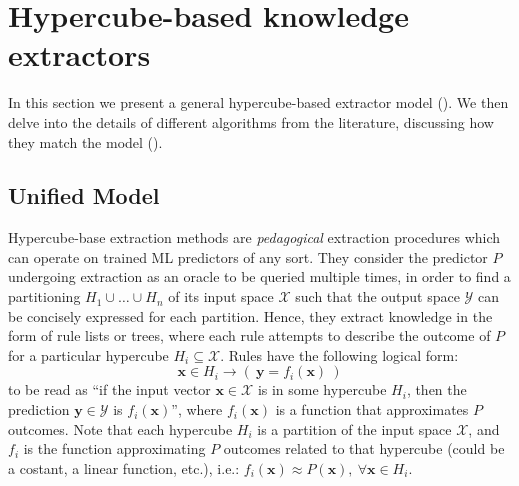 \documentclass[
]{ceurart}
\begin{document}
\section{Hypercube-based knowledge extractors}

In this section we present a general hypercube-based extractor model ().
%
We then delve into the details of different algorithms from the literature, discussing how they match the model ().

\subsection{Unified Model}

Hypercube-base extraction methods are \emph{pedagogical} extraction procedures which can operate on trained ML predictors of any sort.
%
They consider the predictor $P$ undergoing extraction as an oracle to be queried multiple times, in order to find a partitioning $H_1 \cup \ldots \cup H_n$ of its input space $\mathcal{X}$ such that the output space $\mathcal{Y}$ can be concisely %
expressed for each partition.
%
Hence, they extract knowledge in the form of rule lists or trees, where each rule attempts to describe the outcome of $P$ for a particular hypercube $H_i \subseteq \mathcal{X}$. 
%
Rules have the following logical form: 
%
\[ \mathbf{x} \in H_i \rightarrow (~\mathbf{y} = f_i(\mathbf{x})~) \]  
%
to be read as ``if the input vector $\mathbf{x} \in \mathcal{X}$ is in some hypercube $H_i$, then the prediction $\mathbf{y} \in \mathcal{Y}$ is $f_i(\mathbf{x})$'', where $f_i(\mathbf{x})$ is a function that approximates $P$ outcomes.
%
Note that each hypercube $H_i$ is a partition of the input space $\mathcal{X}$, and $f_i$ is the function approximating $P$ outcomes related to that hypercube (could be a costant, a linear function, etc.), i.e.: $f_i(\mathbf{x}) \approx P(\mathbf{x}),~\forall \mathbf{x} \in H_i$.
\end{document}
